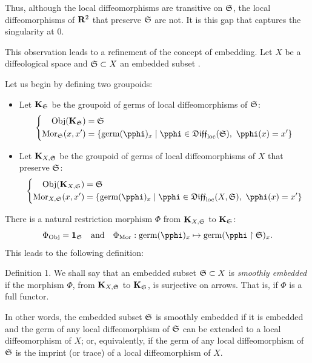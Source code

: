 Thus,
although the local diffeomorphisms are transitive on ${\mathfrak S}$,
the local diffeomorphisms of $\mathbf{R}^2$ that preserve ${\mathfrak S}$ are not.
It is this gap that captures the singularity at $0$.

This observation leads to a refinement of the concept of embedding.
Let $X$ be a diffeological space and ${\mathfrak S} \subset X$ an embedded subset \cite[\textsection\,2.13]{PIZ13}.

Let us begin by defining two groupoids:

\begin{itemize}
  \item[(A)] Let ${\mathbf K}_{{\mathfrak S}}$ be the groupoid of germs of local diffeomorphisms of ${\mathfrak S}$:
  $$
    \left\{
    \begin{aligned}
    \Obj(\KK_{\fS})  & = \fS \\
    \Mor_{\fS}(x,x') & = \{\germ(\pphi)_x \mid \pphi \in \Diff_\loc(\fS), \ \pphi(x) = x'\}
    \end{aligned}
    \right.
    $$
  \item[(B)] Let ${\mathbf K}_{X,{\mathfrak S}}$ be the groupoid of germs of local diffeomorphisms of $X$ that preserve ${\mathfrak S}$:
  $$
    \left\{
    \begin{aligned}
    \Obj(\KK_{X,\fS})  & = \fS \\
    \Mor_{X,\fS}(x,x') & = \{\germ(\pphi)_x \mid \pphi \in \Diff_\loc(X,\fS), \ \pphi(x) = x'\}
    \end{aligned}
    \right.
    $$
\end{itemize}

There is a natural restriction morphism $\Phi$ from ${\mathbf K}_{X,{\mathfrak S}}$ to ${\mathbf K}_{{\mathfrak S}}$:
$$
  \Phi_{\Obj} = \Id_{\fS}
  \quad \text{and} \quad
  \Phi_{\Mor} : \germ(\pphi)_x \mapsto \germ(\pphi\restriction \fS)_x.
  $$
This leads to the following definition:

\begin{Article}{Definition 1.}{}
  We shall say that an embedded subset ${\mathfrak S} \subset X$ is \emph{smoothly embedded} if the morphism $\Phi$,
  from ${\mathbf K}_{X,{\mathfrak S}}$ to ${\mathbf K}_{{\mathfrak S}}$, is surjective on arrows.
  That is,
  if $\Phi$ is a full functor.
\end{Article}

In other words,
the embedded subset ${\mathfrak S}$ is smoothly embedded if it is embedded and the germ of any local diffeomorphism of ${\mathfrak S}$ can be extended to a local diffeomorphism of $X$;
or, equivalently, if the germ of any local diffeomorphism of ${\mathfrak S}$ is the imprint
(or trace)
of a local diffeomorphism of $X$.

